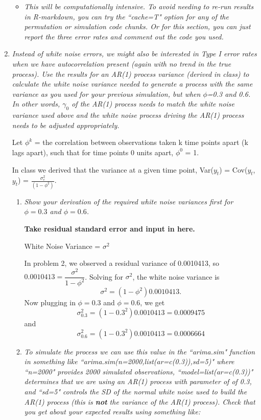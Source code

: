 \documentclass[11pt]{article}
\begin{document}
\begin{enumerate}
\begin{itemize}
\item%
{\it This will be computationally intensive. To avoid needing to re-run results in R-markdown, you can try the ``cache=T" option for any of the permutation or simulation code chunks. Or for this section, you can just report the three error rates and comment out the code you used.}

\end{itemize}

\item%
{\it Instead of white noise errors, we might also be interested in Type I error rates when we have autocorrelation present (again with no trend in the true process). Use the results for an AR(1) process variance (derived in class) to calculate the white noise variance needed to generate a process with the same variance as you used for your previous simulation, but when $\phi$=0.3 and 0.6. In other words, $\gamma_0$ of the AR(1) process needs to match the white noise variance used above and the white noise process driving the AR(1) process needs to be adjusted appropriately.}

Let $\phi^{k}$ = the correlation between observations taken k time points apart (k lags apart), such that for time points 0 units apart, $\phi^{0}$ = 1.

In class we derived that the variance at a given time point, Var($y_{t}$) = Cov($y_{t}$,$y_{t}$) = $\frac{\sigma^2_{e}}{(1-\phi^2)}$.


\begin{enumerate}
\item%
{\it Show your derivation of the required white noise variances first for $\phi=0.3$ and $\phi=0.6$.}

{\bf Take residual standard error and input in here.}

White Noise Variance = $\sigma^2$

In problem 2, we observed a residual variance of 0.0010413, so $0.0010413 = \dfrac{\sigma^2}{1-\phi^2}$. Solving for $\sigma^2$, the white noise variance is
$$
\sigma^2 = (1-\phi^2) 0.0010413.
$$
Now plugging in $\phi=0.3$ and $\phi=0.6$, we get
$$\sigma^2_{0.3} = (1-0.3^2) 0.0010413 = 0.0009475$$
and
$$\sigma^2_{0.6} = (1-0.3^2) 0.0010413 = 0.0006664$$

\item%
{\it To simulate the process we can use this value in the ``arima.sim" function in something like ``arima.sim(n=2000,list(ar=c(0.3)),sd=5)" where ``n=2000" provides 2000 simulated observations, ``model=list(ar=c(0.3))" determines that we are using an AR(1) process with parameter of of 0.3, and ``sd=5" controls the SD of the normal white noise used to build the AR(1) process (this is {\bf not} the variance of the AR(1) process). Check that you get about your expected results using something like:}


\end{enumerate}
\end{enumerate}
\end{document}
